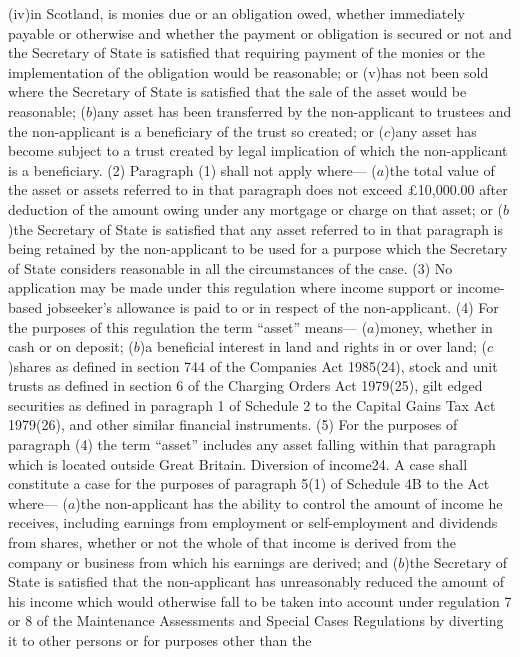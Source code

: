 \documentclass[a4paper]{article}
\begin{document}
(iv)in Scotland, is monies due or an obligation owed, whether immediately
payable or otherwise and whether the payment or obligation is secured or not and
the Secretary of State is satisfied that requiring payment of the monies or the
implementation of the obligation would be reasonable; or
(v)has not been sold where the Secretary of State is satisfied that the sale of
the asset would be reasonable;
($b$)any asset has been transferred by the non-applicant to trustees and the
non-applicant is a beneficiary of the trust so created; or
($c$)any asset has become subject to a trust created by legal implication of which
the non-applicant is a beneficiary.
(2) Paragraph (1) shall not apply where—
($a$)the total value of the asset or assets referred to in that paragraph does not
exceed £10,000.00 after deduction of the amount owing under any mortgage or
charge on that asset; or
($b$)the Secretary of State is satisfied that any asset referred to in that
paragraph is being retained by the non-applicant to be used for a purpose which
the Secretary of State considers reasonable in all the circumstances of the
case.
(3) No application may be made under this regulation where income support or
income-based jobseeker’s allowance is paid to or in respect of the
non-applicant.
(4) For the purposes of this regulation the term “asset” means—
($a$)money, whether in cash or on deposit;
($b$)a beneficial interest in land and rights in or over land;
($c$)shares as defined in section 744 of the Companies Act 1985(24), stock and
unit trusts as defined in section 6 of the Charging Orders Act 1979(25), gilt
edged securities as defined in paragraph 1 of Schedule 2 to the Capital Gains
Tax Act 1979(26), and other similar financial instruments.
(5) For the purposes of paragraph (4) the term “asset” includes any asset
falling within that paragraph which is located outside Great Britain.
Diversion of income24. A case shall constitute a case for the purposes of
paragraph 5(1) of Schedule 4B to the Act where—
($a$)the non-applicant has the ability to control the amount of income he
receives, including earnings from employment or self-employment and dividends
from shares, whether or not the whole of that income is derived from the company
or business from which his earnings are derived; and
($b$)the Secretary of State is satisfied that the non-applicant has unreasonably
reduced the amount of his income which would otherwise fall to be taken into
account under regulation 7 or 8 of the Maintenance Assessments and Special Cases
Regulations by diverting it to other persons or for purposes other than the
\end{document}
